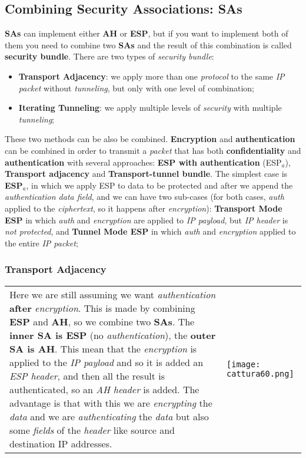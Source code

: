 \documentclass{article}
\begin{document}
\subsection{Combining Security Associations: SAs}
\textbf{SAs} can implement either \textbf{AH} or \textbf{ESP}, but if you want to implement both of them you need to combine two \textbf{SAs} and the result of this combination is called \textbf{security bundle}. There are two types of \emph{security bundle}:
\begin{itemize}
\item \textbf{Transport Adjacency}: we apply more than one \emph{protocol} to the same \emph{IP packet} without \emph{tunneling}, but only with one level of combination;
\item \textbf{Iterating Tunneling}: we apply multiple levels of \emph{security} with multiple \emph{tunneling};
\end{itemize}
These two methods can be also be combined. \textbf{Encryption} and \textbf{authentication} can be combined in order to transmit a \emph{packet} that has both \textbf{confidentiality} and \textbf{authentication} with several approaches: \textbf{ESP with authentication} (ESP$_a$), \textbf{Transport adjacency} and \textbf{Transport-tunnel bundle}. The simplest case is \textbf{ESP}$_a$, in which we apply ESP to data to be protected and after we append the \emph{authentication data field}, and we can have two sub-cases (for both cases, \emph{auth} applied to the \emph{ciphertext}, so it happens after \emph{encryption}): \textbf{Transport Mode ESP} in which \emph{auth} and \emph{encryption} are applied to \emph{IP payload}, but \emph{IP header} is \emph{not protected}, and \textbf{Tunnel Mode ESP} in which \emph{auth} and \emph{encryption} applied to the entire \emph{IP packet};
\subsubsection{Transport Adjacency}
\begin{tabular}{C{9.5cm}  L{10.5cm}}
Here we are still assuming we want \emph{authentication} \textbf{after} \emph{encryption}. This is made by combining \textbf{ESP} and \textbf{AH}, so we combine two \textbf{SAs}. The \textbf{inner SA is ESP} (no \emph{authentication}), the \textbf{outer SA is AH}. This mean that the \emph{encryption} is applied to the \emph{IP payload} and so it is added an \emph{ESP header}, and then all the result is authenticated, so an \emph{AH header} is added. The advantage is that with this we are \emph{encrypting} the \emph{data} and we are \emph{authenticating} the \emph{data} but also some \emph{fields} of the \emph{header} like source and destination IP addresses. 
& \texttt{[image: cattura60.png]}
\end{tabular} 
\end{document}
